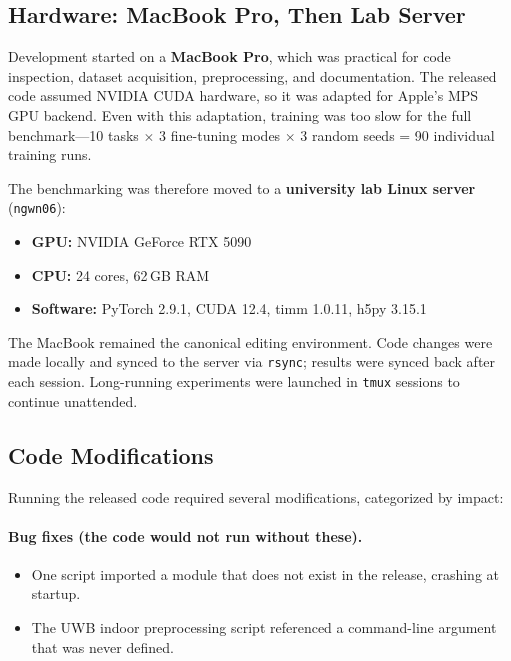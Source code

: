 \documentclass[11pt]{article}
\newcommand{\code}[1]{\texttt{#1}}
\begin{document}
\subsection{Hardware: MacBook Pro, Then Lab Server}
\label{subsec:hardware}

Development started on a \textbf{MacBook Pro}, which was practical for code inspection, dataset acquisition, preprocessing, and documentation. The released code assumed NVIDIA CUDA hardware, so it was adapted for Apple's MPS GPU backend. Even with this adaptation, training was too slow for the full benchmark---10 tasks $\times$ 3 fine-tuning modes $\times$ 3 random seeds = 90 individual training runs.

The benchmarking was therefore moved to a \textbf{university lab Linux server} (\code{ngwn06}):
\begin{itemize}
    \item \textbf{GPU:} NVIDIA GeForce RTX 5090
    \item \textbf{CPU:} 24 cores, 62\,GB RAM
    \item \textbf{Software:} PyTorch 2.9.1, CUDA 12.4, timm 1.0.11, h5py 3.15.1
\end{itemize}

The MacBook remained the canonical editing environment. Code changes were made locally and synced to the server via \code{rsync}; results were synced back after each session. Long-running experiments were launched in \code{tmux} sessions to continue unattended.

\subsection{Code Modifications}
\label{subsec:code_changes}

Running the released code required several modifications, categorized by impact:

\paragraph{Bug fixes (the code would not run without these).}
\begin{itemize}
    \item One script imported a module that does not exist in the release, crashing at startup.
    \item The UWB indoor preprocessing script referenced a command-line argument that was never defined.
\end{itemize}
\end{document}
